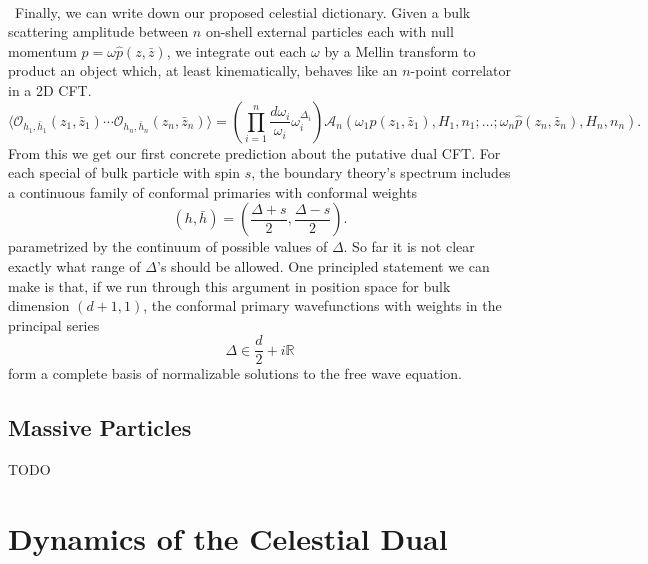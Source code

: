 \documentclass[11pt,letterpaper]{article}
\newcommand{\LP}{\left(}
\newcommand{\RP}{\right)}
\newcommand{\mc}[1]{\mathcal{#1}}
\newcommand{\R}{\mathbb{R}}
\begin{document}
\\
\
Finally, we can write down our proposed celestial dictionary. Given a bulk scattering amplitude between $n$ on-shell external particles each with null momentum $p = \omega \hat{p}(z, \bar{z})$, we integrate out each $\omega$ by a Mellin transform to product an object which, at least kinematically, behaves like an $n$-point correlator in a 2D CFT. \begin{equation}
\langle \mc{O}_{h_1, \bar{h}_1}(z_1, \bar{z}_1) \cdots \mc{O}_{h_n, \bar{h}_n}(z_n, \bar{z}_n) \rangle = \LP \prod_{i=1}^n \frac{d \omega_i}{\omega_i} \omega_i^{\Delta_i} \RP \mc{A}_n \LP \omega_1 \hat{p}(z_1, \bar{z}_1), H_1, n_1; \ldots; \omega_n \hat{p}(z_n, \bar{z}_n), H_n, n_n \RP.
\end{equation}
From this we get our first concrete prediction about the putative dual CFT. For each special of bulk particle with spin $s$, the boundary theory's spectrum includes a continuous family of conformal primaries with conformal weights \begin{equation}
\LP h, \bar{h} \RP = \LP \frac{\Delta + s}{2}, \frac{\Delta - s}{2} \RP.
\end{equation}
parametrized by the continuum of possible values of $\Delta$. So far it is not clear exactly what range of $\Delta$'s should be allowed. One principled statement we can make is that, if we run through this argument in position space for bulk dimension $(d+1,1)$, the conformal primary wavefunctions with weights in the principal series \cite{Pasterski:2017kqt} \begin{equation}
\Delta \in \frac{d}{2} + i \R
\end{equation}
form a complete basis of normalizable solutions to the free wave equation.



\subsection{Massive Particles}
TODO




\section{Dynamics of the Celestial Dual}
\end{document}
